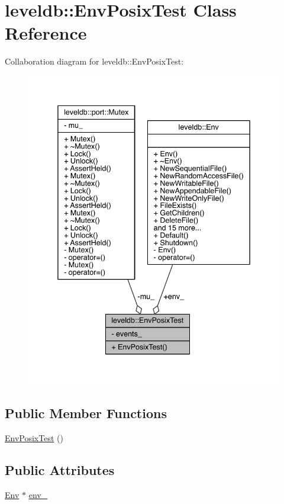 \hypertarget{classleveldb_1_1_env_posix_test}{}\section{leveldb\+:\+:Env\+Posix\+Test Class Reference}
\label{classleveldb_1_1_env_posix_test}


Collaboration diagram for leveldb\+:\+:Env\+Posix\+Test\+:\nopagebreak
\begin{figure}[H]
\begin{center}
\leavevmode
\includegraphics[width=338pt]{classleveldb_1_1_env_posix_test__coll__graph}
\end{center}
\end{figure}
\subsection*{Public Member Functions}
\begin{DoxyCompactItemize}
\item 
\hyperlink{classleveldb_1_1_env_posix_test_a05fceab267ecdc2948ec96a3a6145bb3}{Env\+Posix\+Test} ()
\end{DoxyCompactItemize}
\subsection*{Public Attributes}
\begin{DoxyCompactItemize}
\item 
\hyperlink{classleveldb_1_1_env}{Env} $\ast$ \hyperlink{classleveldb_1_1_env_posix_test_a6d8ded8756fa7391e086fb31a865e639}{env\+\_\+}
\end{DoxyCompactItemize}

